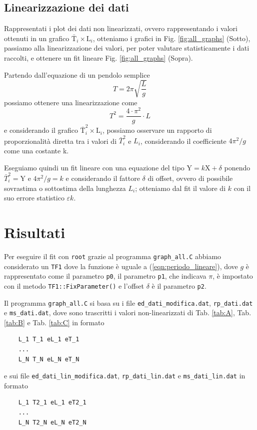 \documentclass[italian, a4paper, 10pt, twocolumn]{../../style/lab_unige}
\newcommand{\reftab}[1]{Tab. {\ref{#1}}}%
\newcommand{\reffig}[1]{Fig. {\ref{#1}}}%
\newcommand{\refeqn}[1]{({\ref{#1})}}%
\begin{document}
  \subsection{Linearizzazione dei dati}

  Rappresentati i plot dei dati non linearizzati, ovvero rappresentando i valori ottenuti in un grafico 
  $\bar{\text{T}}_{i}\times \text{L}_{i}$, otteniamo i grafici in \reffig{fig:all_graphs} (Sotto), 
  passiamo alla linearizzazione dei valori, per poter valutare statisticamente i dati raccolti, e 
  ottenere un fit lineare \reffig{fig:all_graphs} (Sopra).

  Partendo dall'equazione di un pendolo semplice
  \begin{equation}\label{eqn:periodo_sqrt}
    T=2\pi\sqrt{\frac{L}{g}}
  \end{equation}
  possiamo ottenere una linearizzazione come
  \begin{equation}\label{eqn:periodo_lineare}
    T^{2}=\frac{4\cdot\pi^{2}}{g}\cdot L
  \end{equation}
  e considerando il grafico $\bar{\text{T}}_{i}^{2}\times \text{L}_{i}$, possiamo osservare un rapporto 
  di proporzionalità diretta tra i valori di $\bar{T}_{i}^{2}$ e $L_{i}$, considerando il coefficiente 
  $4\pi^{2}/g$ come una costante k.

  Eseguiamo quindi un fit lineare con una equazione del tipo $\text{Y}=k\text{X}+\delta$ ponendo 
  $\bar{T}_{i}^{2}=\text{Y}$ e $4\pi^{2}/g=k$ e considerando il fattore $\delta$ di offset, ovvero di 
  possibile sovrastima o sottostima della lunghezza $L_{i}$; otteniamo dal fit il valore di $k$ con 
  il suo errore statistico $\varepsilon k$.


  \section{Risultati}
  \label{section:risultati}

  Per eseguire il fit con \verb|root| grazie al programma \verb|graph_all.C| abbiamo considerato un 
  \verb|TF1| dove la funzione è uguale a \refeqn{eqn:periodo_lineare}, dove $g$ è rappresentato come il 
  parametro \verb|p0|, il parametro \verb|p1|, che indicava $\pi$, è impostato con il metodo 
  \verb|TF1::FixParameter()| e l'offset $\delta$ è il parametro \verb|p2|.

  Il programma \verb|graph_all.C| si basa su i file \verb|ed_dati_modifica.dat|, 
  \verb|rp_dati.dat| e \verb|ms_dati.dat|, dove 
  sono trascritti i valori non-linearizzati di \reftab{tab:A}, \reftab{tab:B} e \reftab{tab:C} in formato
  \begin{verbatim}
    L_1 T_1 eL_1 eT_1
    ...
    L_N T_N eL_N eT_N
  \end{verbatim}
  e sui file \verb|ed_dati_lin_modifica.dat|, \verb|rp_dati_lin.dat| e \verb|ms_dati_lin.dat|
  in formato
  \begin{verbatim}
    L_1 T2_1 eL_1 eT2_1
    ...
    L_N T2_N eL_N eT2_N
  \end{verbatim}
\end{document}
